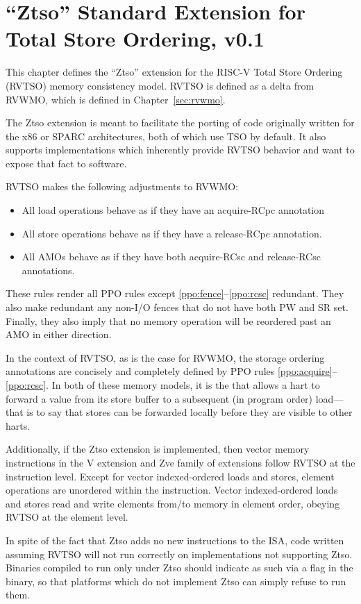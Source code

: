 \chapter{``Ztso'' Standard Extension for Total Store Ordering, v0.1}
\label{sec:ztso}

This chapter defines the ``Ztso'' extension for the RISC-V Total Store Ordering (RVTSO) memory consistency model.
RVTSO is defined as a delta from RVWMO, which is defined in Chapter~\ref{sec:rvwmo}.

\begin{commentary}
  The Ztso extension is meant to facilitate the porting of code originally written for the x86 or SPARC architectures, both of which use TSO by default.
  It also supports implementations which inherently provide RVTSO behavior and want to expose that fact to software.
\end{commentary}

RVTSO makes the following adjustments to RVWMO:

\begin{itemize}
  \item All load operations behave as if they have an acquire-RCpc annotation
  \item All store operations behave as if they have a release-RCpc annotation.
  \item All AMOs behave as if they have both acquire-RCsc and release-RCsc annotations.
\end{itemize}

\begin{commentary}
  These rules render all PPO rules except \ref{ppo:fence}--\ref{ppo:rcsc} redundant.
  They also make redundant any non-I/O fences that do not have both PW and SR set.
  Finally, they also imply that no memory operation will be reordered past an AMO in either direction.
  
  In the context of RVTSO, as is the case for RVWMO, the storage ordering annotations are concisely and completely defined by PPO rules \ref{ppo:acquire}--\ref{ppo:rcsc}. In both of these memory models, it is the  that allows a hart to forward a value from its store buffer to a subsequent (in program order) load---that is to say that stores can be forwarded locally before they are visible to other harts.
\end{commentary}

Additionally, if the Ztso extension is implemented, then vector memory
instructions in the V extension and Zve family of extensions follow RVTSO at
the instruction level.
Except for vector indexed-ordered loads and stores,
element operations are unordered within the instruction.
Vector indexed-ordered loads and stores read and write elements from/to memory
in element order, obeying RVTSO at the element level.

In spite of the fact that Ztso adds no new instructions to the ISA, code written assuming RVTSO will not run correctly on implementations not supporting Ztso.
Binaries compiled to run only under Ztso should indicate as such via a flag in the binary, so that platforms which do not implement Ztso can simply refuse to run them.
